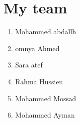 \documentclass{article}
\begin{document}
\section{My team}
\begin{enumerate}
\item Mohammed abdallh 
\item omnya Ahmed 
\item Sara atef 
\item Rahma Hussien 
\item Mohammed Mossad 
\item Mohammed Ayman
\end{enumerate}
\end{document}
